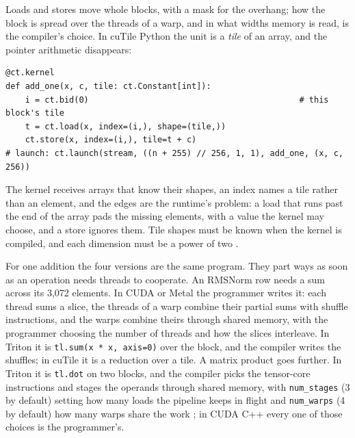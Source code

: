 \noindent Loads and stores move whole blocks, with a mask for the overhang; how
the block is spread over the threads of a warp, and in what widths memory is
read, is the compiler's choice. In cuTile Python the unit is a \emph{tile} of
an array, and the pointer arithmetic disappears:

\begin{verbatim}
@ct.kernel
def add_one(x, c, tile: ct.Constant[int]):
    i = ct.bid(0)                                           # this block's tile
    t = ct.load(x, index=(i,), shape=(tile,))
    ct.store(x, index=(i,), tile=t + c)
# launch: ct.launch(stream, ((n + 255) // 256, 1, 1), add_one, (x, c, 256))
\end{verbatim}

\noindent The kernel receives arrays that know their shapes, an index names a
tile rather than an element, and the edges are the runtime's problem: a load
that runs past the end of the array pads the missing elements, with a value
the kernel may choose, and a store ignores them. Tile shapes must be known when the kernel is compiled, and each
dimension must be a power of two \cite{nvidia2026cutile}.

For one addition the four versions are the same program. They part ways as
soon as an operation needs threads to cooperate. An RMSNorm row needs a sum
across its 3,072 elements. In CUDA or Metal the programmer writes it: each
thread sums a slice, the threads of a warp combine their partial sums with
shuffle instructions, and the warps combine theirs through shared memory, with
the programmer choosing the number of threads and how the slices interleave.
In Triton it is \texttt{tl.sum(x * x, axis=0)} over the block, and the compiler
writes the shuffles; in cuTile it is a reduction over a tile. A matrix product
goes further. In Triton it is \texttt{tl.dot} on two blocks, and the compiler
picks the tensor-core instructions and stages the operands through shared
memory, with \texttt{num\_stages} (3 by default) setting how many loads the
pipeline keeps in flight and \texttt{num\_warps} (4 by default) how many warps
share the work \cite{triton2026config}; in CUDA C++ every one of those choices
is the programmer's.

